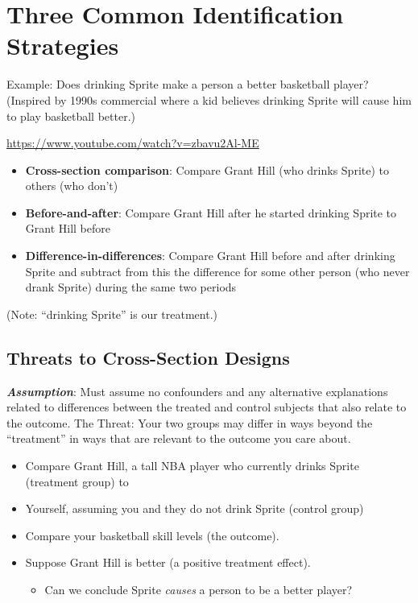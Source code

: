 \documentclass[
  letterpaper,
  DIV=11,
  numbers=noendperiod]{scrreprt}
\providecommand{\tightlist}{%
  \setlength{\itemsep}{0pt}\setlength{\parskip}{0pt}}\usepackage{longtable,booktabs,array}
\begin{document}
\hypertarget{three-common-identification-strategies}{%
\section{Three Common Identification
Strategies}\label{three-common-identification-strategies}}

Example: Does drinking Sprite make a person a better basketball player?
(Inspired by 1990s commercial where a kid believes drinking Sprite will
cause him to play basketball better.)

\url{https://www.youtube.com/watch?v=zbavu2Al-ME}

\begin{itemize}
\tightlist
\item
  \textbf{Cross-section comparison}: Compare Grant Hill (who drinks
  Sprite) to others (who don't)
\item
  \textbf{Before-and-after}: Compare Grant Hill after he started
  drinking Sprite to Grant Hill before
\item
  \textbf{Difference-in-differences}: Compare Grant Hill before and
  after drinking Sprite and subtract from this the difference for some
  other person (who never drank Sprite) during the same two periods
\end{itemize}

(Note: ``drinking Sprite'' is our treatment.)

\hypertarget{threats-to-cross-section-designs}{%
\subsection{Threats to Cross-Section
Designs}\label{threats-to-cross-section-designs}}

\textbf{\emph{Assumption}}: Must assume no confounders and any
alternative explanations related to differences between the treated and
control subjects that also relate to the outcome. The Threat: Your two
groups may differ in ways beyond the ``treatment'' in ways that are
relevant to the outcome you care about.

\begin{itemize}
\tightlist
\item
  Compare Grant Hill, a tall NBA player who currently drinks Sprite
  (treatment group) to
\item
  Yourself, assuming you and they do not drink Sprite (control group)
\item
  Compare your basketball skill levels (the outcome).
\item
  Suppose Grant Hill is better (a positive treatment effect).

  \begin{itemize}
  \tightlist
  \item
    Can we conclude Sprite \emph{causes} a person to be a better player?
  \end{itemize}
\end{itemize}
\end{document}
